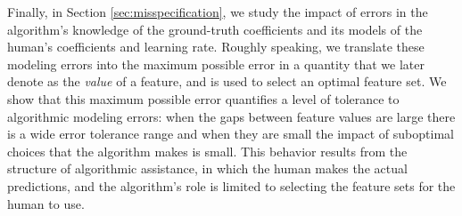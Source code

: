 Finally, in Section \ref{sec:misspecification}, we study the impact of errors in the algorithm's knowledge of the ground-truth coefficients and its models of the human's coefficients and learning rate. Roughly speaking, we translate these modeling errors into the maximum possible error in a quantity that we later denote as the \emph{value} of a feature, and is used to select an optimal feature set. We show that this maximum possible error quantifies a level of tolerance to algorithmic modeling errors: when the gaps between feature values are large there is a wide error tolerance range and when they are small the impact of suboptimal choices that the algorithm makes is small. %
This behavior results from the structure of algorithmic assistance, in which the human makes the actual predictions, and the algorithm's role is limited to selecting the feature sets for the human to use.




